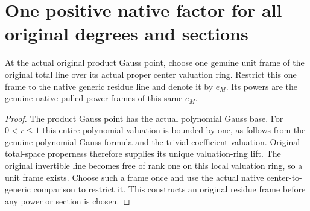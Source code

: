 \section{One positive native factor for all original degrees and sections}

\begin{definition}\label{def:native-tc-one-proper-center-power-frame}
\leanok
{}
At the actual original product Gauss point, choose one genuine
unit frame of the original total line over its actual proper
center valuation ring. Restrict this one frame to the native
generic residue line and denote it by $e_M$. Its powers are the
genuine native pulled power frames of this same $e_M$.
\end{definition}
\begin{proof}
The product Gauss point has the actual polynomial Gauss base.
For $0<r\leq1$ this entire polynomial valuation is bounded by one,
as follows from the genuine polynomial Gauss formula and the
trivial coefficient valuation. Original total-space properness
therefore supplies its unique valuation-ring lift. The original
invertible line becomes free of rank one on this local valuation
ring, so a unit frame exists. Choose such a frame once and use
the actual native center-to-generic comparison to restrict it.
This constructs an original residue frame before any power or
section is chosen.
\end{proof}

